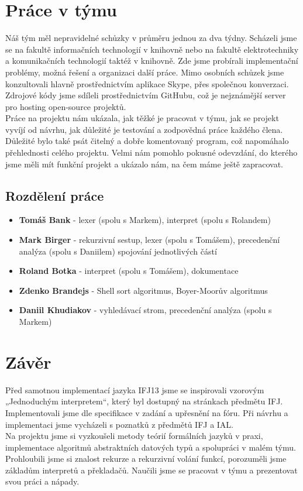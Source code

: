 \documentclass[11pt,a4paper,titlepage]{article}
\begin{document}
\section{Práce v týmu} \label{5}
\bigskip
	\hspace{1cm}Náš tým měl nepravidelné schůzky v průměru jednou za dva týdny. Scházeli jsme se na fakultě informačních technologií v knihovně nebo na fakultě elektrotechniky a komunikačních technologií taktéž v knihovně. Zde jsme probírali implementační problémy, možná řešení a organizaci další práce. Mimo osobních schůzek jsme konzultovali hlavně prostřednictvím aplikace Skype, přes společnou konverzaci. Zdrojové kódy jsme sdíleli prostřednictvím GitHubu, což je nejznámější server pro hosting open-source projektů. \\
	\smallskip
	\hspace{1cm} Práce na projektu nám ukázala, jak těžké je pracovat v týmu, jak se projekt vyvíjí od návrhu, jak důležité je testování a zodpovědná práce každého člena. Důležité bylo také psát čitelný a dobře komentovaný program, což napomáhalo přehlednosti celého projektu. Velmi nám pomohlo pokusné odevzdání, do kterého jsme měli mít funkční projekt a ukázalo nám, na čem máme ještě zapracovat. 
\smallskip
	\subsection {Rozdělení práce}
	\bigskip
	\begin{itemize}
	\item \textbf{Tomáš Bank} - lexer (spolu s Markem), interpret (spolu s Rolandem)
	\item \textbf{Mark Birger} - rekurzivní sestup, lexer (spolu s Tomášem), precedenční analýza (spolu s Daniilem) spojování jednotlivých částí
	\item \textbf{Roland Botka} - interpret (spolu s Tomášem), dokumentace
	\item \textbf{Zdenko Brandejs} - Shell sort algoritmus, Boyer-Moorův algoritmus
	\item \textbf{Daniil Khudiakov} - vyhledávací strom, precedenční analýza (spolu s Markem)
	\end{itemize}
	\smallskip
	

\section{Závěr}       \label{6}
\bigskip
	\hspace{1cm}Před samotnou implementací jazyka IFJ13 jsme se inspirovali vzorovým „Jednoduchým interpretem“, který byl dostupný na stránkach předmětu IFJ. Implementovali jsme dle specifikace v zadání a upřesnění na fóru. Při návrhu a implementaci jsme vycházeli s poznatků z předmětů IFJ a IAL. \\
	\smallskip
	\hspace{1cm} Na projektu jsme si vyzkoušeli metody teórií formálních jazyků v praxi, implementace algoritmů abstraktních datových typů a spolupráci v malém týmu. Prohloubili jsme si znalost rekurze a rekurzivní volání funkcí, porozuměli jsme základům interpretů a překladačů. Naučili jsme se pracovat v týmu a prezentovat svou práci a nápady.
\end{document}
